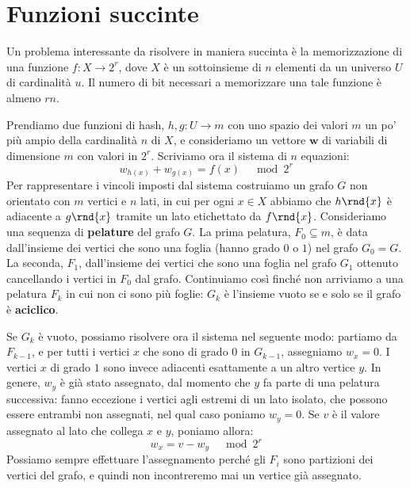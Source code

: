 \documentclass[\main/main.tex]{subfiles}
\begin{document}
\section{Funzioni succinte}
\begin{example}
    Un problema interessante da risolvere in maniera succinta è la memorizzazione di una funzione \(f:X\rightarrow 2^r\), dove \(X\) è un sottoinsieme di \(n\) elementi da un universo \(U\) di cardinalità \(u\). Il numero di bit necessari a memorizzare una tale funzione è almeno \(rn\).
    
    Prendiamo due funzioni di hash, \(h, g: U \rightarrow m\) con uno spazio dei valori \(m\) un po' più ampio della cardinalità \(n\) di \(X\), e consideriamo un vettore \(\bm{w}\) di variabili di dimensione \(m\) con valori in \(2^r\). Scriviamo ora il sistema di \(n\) equazioni:
    \[
        w_{h(x)}+w_{g(x)}=f(x) \quad \bmod 2^{r}
    \]
    Per rappresentare i vincoli imposti dal sistema costruiamo un grafo \(G\) non orientato con \(m\) vertici e \(n\) lati, in cui per ogni \(x \in X\) abbiamo che \(h\rnd{x}\) è adiacente a \(g\rnd{x}\) tramite un lato etichettato da \(f\rnd{x}\). Consideriamo una sequenza di \textbf{pelature} del grafo \(G\). La prima pelatura, \(F_0 \subseteq m\), è data dall'insieme dei vertici che sono una foglia (hanno grado \(0\) o \(1\)) nel grafo \(G_0 = G\). La seconda, \(F_1\), dall'insieme dei vertici che sono una foglia nel grafo \(G_1\) ottenuto cancellando i vertici in \(F_0\) dal grafo. Continuiamo così finché non arriviamo a una pelatura \(F_k\) in cui non ci sono più foglie: \(G_k\) è l'insieme vuoto se e solo se il grafo è \textbf{aciclico}.
    
    Se \(G_k\) è vuoto, possiamo risolvere ora il sistema nel seguente modo: partiamo da \(F_{k-1}\), e per tutti i vertici \(x\) che sono di grado \(0\) in \(G_{k-1}\), assegniamo \(w_x = 0\). I vertici \(x\) di grado \(1\) sono invece adiacenti esattamente a un altro vertice \(y\). In genere, \(w_y\) è già stato assegnato, dal momento che \(y\) fa parte di una pelatura successiva: fanno eccezione i vertici agli estremi di un lato isolato, che possono essere entrambi non assegnati, nel qual caso poniamo \(w_y = 0\). Se \(v\) è il valore assegnato al lato che collega \(x\) e \(y\), poniamo allora:
    \[
        w_{x}=v-w_{y} \quad \bmod 2^{r}
    \]
    Possiamo sempre effettuare l'assegnamento perché gli \(F_i\) sono partizioni dei vertici del grafo, e quindi non incontreremo mai un vertice già assegnato.
\end{example}
\end{document}
